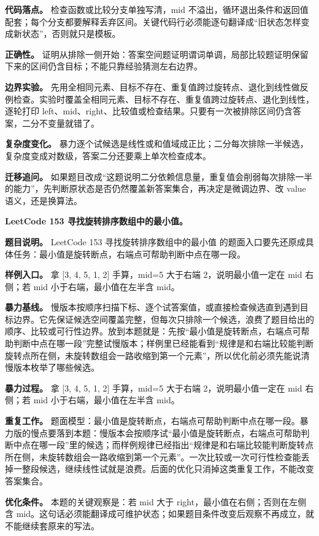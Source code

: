 \textbf{代码落点。} 检查函数或比较分支单独写清，mid 不溢出，循环退出条件和返回值配套；每个分支都要解释丢弃区间。关键代码行必须能逐句翻译成“旧状态怎样变成新状态”，否则就只是模板。

\textbf{正确性。} 证明从排除一侧开始：答案空间题证明谓词单调，局部比较题证明保留下来的区间仍含目标；不能只靠经验猜测左右边界。

\textbf{边界实验。} 先用全相同元素、目标不存在、重复值跨过旋转点、退化到线性做反例检查。实验时覆盖全相同元素、目标不存在、重复值跨过旋转点、退化到线性，逐轮打印 left、mid、right、比较值或检查结果。只要有一次被排除区间仍含答案，二分不变量就错了。

\textbf{复杂度变化。} 暴力逐个试候选是线性或和值域成正比；二分每次排除一半候选，复杂度变成对数级，答案二分还要乘上单次检查成本。

\textbf{迁移追问。} 如果题目改成“这题说明二分依赖信息量，重复值会削弱每次排除一半的能力”，先判断原状态是否仍然覆盖新答案集合，再决定是微调边界、改 value 语义，还是换算法。

\noindent\textbf{LeetCode 153 寻找旋转排序数组中的最小值。}

\textbf{题目说明。} LeetCode 153 寻找旋转排序数组中的最小值 的题面入口要先还原成具体任务：最小值是旋转断点，右端点可帮助判断中点在哪一段。

\textbf{样例入口。} 拿 [3, 4, 5, 1, 2] 手算，mid=5 大于右端 2，说明最小值一定在 mid 右侧；若 mid 小于右端，最小值在左半含 mid。

\textbf{暴力基线。} 慢版本按顺序扫描下标、逐个试答案值，或直接检查候选直到遇到目标边界。它先保证候选空间覆盖完整，但每次只排除一个候选，浪费了题目给出的顺序、比较或可行性边界。放到本题就是：先按“最小值是旋转断点，右端点可帮助判断中点在哪一段”完整试慢版本；样例里已经能看到“规律是和右端比较能判断旋转点所在侧，未旋转数组会一路收缩到第一个元素”，所以优化前必须先能说清慢版本枚举了哪些候选。

\textbf{暴力过程。} 拿 [3, 4, 5, 1, 2] 手算，mid=5 大于右端 2，说明最小值一定在 mid 右侧；若 mid 小于右端，最小值在左半含 mid。

\textbf{重复工作。} 题面模型：最小值是旋转断点，右端点可帮助判断中点在哪一段。暴力版的慢点要落到本题：慢版本会按顺序试“最小值是旋转断点，右端点可帮助判断中点在哪一段”里的候选；而样例规律已经指出“规律是和右端比较能判断旋转点所在侧，未旋转数组会一路收缩到第一个元素”。一次比较或一次可行性检查能丢掉一整段候选，继续线性试就是浪费。后面的优化只消掉这类重复工作，不能改变答案集合。

\textbf{优化条件。} 本题的关键观察是：若 mid 大于 right，最小值在右侧；否则在左侧含 mid。这句话必须能翻译成可维护状态；如果题目条件改变后观察不再成立，就不能继续套原来的写法。

